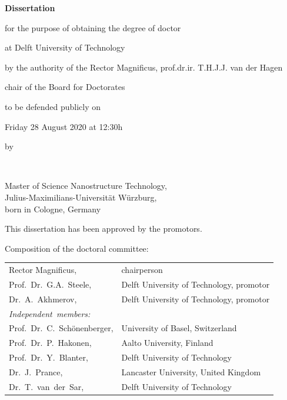 \begin{titlepage}
\begin{center}
{\Large\titlefont\bfseries Dissertation}

\bigskip
\bigskip

for the purpose of obtaining the degree of doctor

at Delft University of Technology

by the authority of the Rector Magnificus, prof.dr.ir. T.H.J.J. van der Hagen

chair of the Board for Doctorates

to be defended publicly on

Friday 28 August 2020 at 12:30h

\bigskip
\bigskip

by

\bigskip
\bigskip

\makeatletter
{\Large\titlefont\bfseries\@firstname\ {\titleshape\@lastname}}
\makeatother

\bigskip
\bigskip

Master of Science Nanostructure Technology, \\
Julius-Maximilians-Universität Würzburg, \\
born in Cologne, Germany

\vspace*{2\bigskipamount}

\end{center}

\clearpage
\thispagestyle{empty}

\noindent This dissertation has been approved by the promotors.

\bigskip
\noindent Composition of the doctoral committee:

\medskip\noindent
\begin{tabular}{p{3.5cm}l}
    Rector Magnificus, & chairperson \\
%    
    Prof.~Dr.~G.A.~Steele, & Delft University of Technology, promotor \\
%    
    Dr.~A.~Akhmerov, & Delft University of Technology, promotor \\

    \medskip
    \mbox{\emph{Independent members:}} & \\
    
    Prof.~Dr.~C.~Schönenberger, & University of Basel, Switzerland \\
%    
    Prof.~Dr.~P.~Hakonen, & Aalto University, Finland \\
%    
    Prof.~Dr.~Y.~Blanter, & Delft University of Technology \\
%    
    Dr.~J.~Prance, & Lancaster University, United Kingdom \\
%
    Dr.~T.~van~der~Sar, & Delft University of Technology \\
    

\end{tabular}
\end{titlepage}
